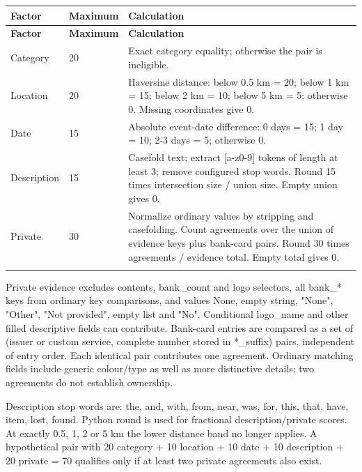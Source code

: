 \documentclass[12pt,a4paper,oneside]{report}
\begin{document}
\begin{longtable}{@{}P{0.19\dimexpr\textwidth-24pt\relax}P{0.14\dimexpr\textwidth-24pt\relax}P{0.67\dimexpr\textwidth-24pt\relax}@{}}

\toprule \textbf{Factor} & \textbf{Maximum} & \textbf{Calculation} \\ \midrule\endfirsthead

\toprule \textbf{Factor} & \textbf{Maximum} & \textbf{Calculation} \\ \midrule\endhead

\bottomrule\endfoot

Category & 20 & Exact category equality; otherwise the pair is ineligible. \\ \addlinespace[3pt]

Location & 20 & Haversine distance: below 0.5 km = 20; below 1 km = 15; below 2 km = 10; below 5 km = 5; otherwise 0. Missing coordinates give 0. \\ \addlinespace[3pt]

Date & 15 & Absolute event-date difference: 0 days = 15; 1 day = 10; 2-3 days = 5; otherwise 0. \\ \addlinespace[3pt]

Description & 15 & Casefold text; extract [a-z0-9] tokens of length at least 3; remove configured stop words. Round 15 times intersection size / union size. Empty union gives 0. \\ \addlinespace[3pt]

Private & 30 & Normalize ordinary values by stripping and casefolding. Count agreements over the union of evidence keys plus bank-card pairs. Round 30 times agreements / evidence total. Empty total gives 0. \\ \addlinespace[3pt]

\end{longtable}

Private evidence excludes contents, bank\_count and logo selectors, all bank\_* keys from ordinary key comparisons, and values None, empty string, "None", "Other", "Not provided", empty list and "No". Conditional logo\_name and other filled descriptive fields can contribute. Bank-card entries are compared as a set of (issuer or custom service, complete number stored in *\_suffix) pairs, independent of entry order. Each identical pair contributes one agreement. Ordinary matching fields include generic colour/type as well as more distinctive details; two agreements do not establish ownership.

Description stop words are: the, and, with, from, near, was, for, this, that, have, item, lost, found. Python round is used for fractional description/private scores. At exactly 0.5, 1, 2 or 5 km the lower distance band no longer applies. A hypothetical pair with 20 category + 10 location + 10 date + 10 description + 20 private = 70 qualifies only if at least two private agreements also exist.
\end{document}
